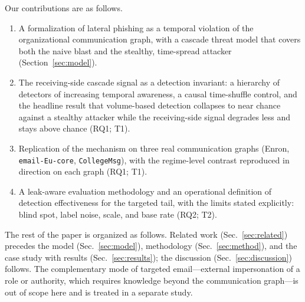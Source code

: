 Our contributions are as follows.
\begin{enumerate}[noitemsep,topsep=2pt]
  \item A formalization of lateral phishing as a temporal violation of the organizational communication
  graph, with a cascade threat model that covers both the naive blast and the stealthy, time-spread attacker
  (Section~\ref{sec:model}).
  \item The receiving-side cascade signal as a detection invariant: a hierarchy of detectors of increasing
  temporal awareness, a causal time-shuffle control, and the headline result that volume-based detection
  collapses to near chance against a stealthy attacker while the receiving-side signal degrades
  less and stays above chance (RQ1; T1).
  \item Replication of the mechanism on three real communication graphs (Enron, \texttt{email-Eu-core},
  \texttt{CollegeMsg}), with the regime-level contrast reproduced in direction on each graph (RQ1; T1).
  \item A leak-aware evaluation methodology and an operational definition of detection effectiveness for the
  targeted tail, with the limits stated explicitly: blind spot, label noise, scale, and base rate (RQ2; T2).
\end{enumerate}

The rest of the paper is organized as follows. Related work (Sec.~\ref{sec:related}) precedes the model
(Sec.~\ref{sec:model}), methodology (Sec.~\ref{sec:method}), and the case study with results
(Sec.~\ref{sec:results}); the discussion (Sec.~\ref{sec:discussion}) follows. The complementary mode of
targeted email---external impersonation of a role or authority, which requires knowledge beyond the
communication graph---is out of scope here and is treated in a separate study.
